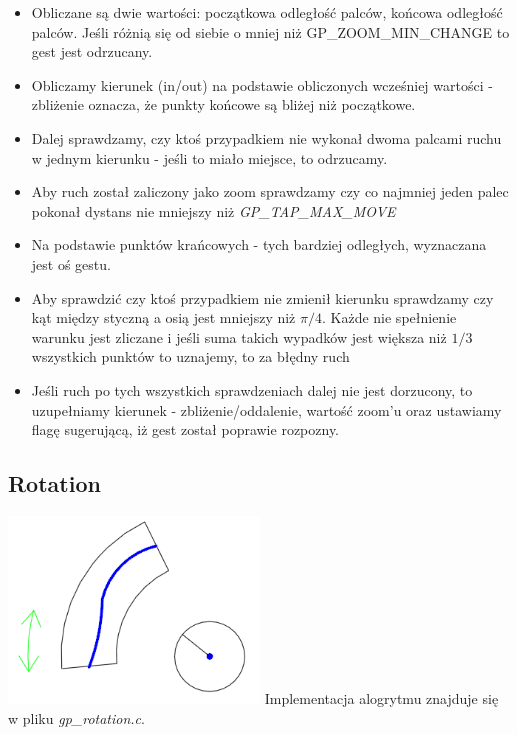 \documentclass[a4paper,12pt]{article}
\begin{document}
	\begin{itemize}
		\item Obliczane są dwie wartości: początkowa odległość palców, końcowa odległość palców. Jeśli różnią się od siebie o mniej niż GP_ZOOM_MIN_CHANGE to gest jest odrzucany.
		\item Obliczamy kierunek (in/out) na podstawie obliczonych wcześniej wartości - zbliżenie oznacza, że punkty końcowe są bliżej niż początkowe.
		\item Dalej sprawdzamy, czy ktoś przypadkiem nie wykonał dwoma palcami ruchu w jednym kierunku - jeśli to miało miejsce, to odrzucamy.
		\item Aby ruch został zaliczony jako zoom sprawdzamy czy co najmniej jeden palec pokonał dystans nie mniejszy niż \textit{GP_TAP_MAX_MOVE}
		\item Na podstawie punktów krańcowych - tych bardziej odległych, wyznaczana jest oś gestu.
		\item Aby sprawdzić czy ktoś przypadkiem nie zmienił kierunku sprawdzamy czy kąt między styczną a osią jest mniejszy niż $\pi/4$. Każde nie spełnienie warunku jest zliczane i jeśli suma takich wypadków jest większa niż $1/3$ wszystkich punktów to uznajemy, to za błędny ruch
		\item Jeśli ruch po tych wszystkich sprawdzeniach dalej nie jest dorzucony, to uzupełniamy kierunek - zbliżenie/oddalenie, wartość zoom'u oraz ustawiamy flagę sugerującą, iż gest został poprawie rozpozny.
	\end{itemize}		

	
	\subsection{Rotation} \includegraphics[width=0.5\textwidth]{../data/ImplRotate} Implementacja alogrytmu znajduje się w pliku \textit{gp_rotation.c}. 
		
\end{document}
